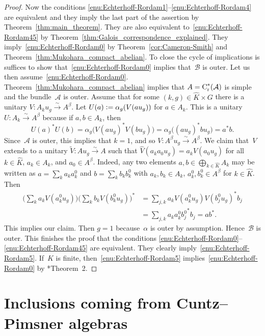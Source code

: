 \documentclass[a4paper]{amsart}
\theoremstyle{plain}
\theoremstyle{definition}
\theoremstyle{remark}
\numberwithin{theorem}{section}
\numberwithin{equation}{section}
\newcommand*{\red}{\mathrm{r}}%
\newcommand*{\Cst}{\textup C^*}%
\newcommand*{\B}{\mathcal B}%
\newcommand*{\A}{\mathcal A}%
\newcommand*{\defeq}{\mathrel{\vcentcolon=}}%
\newcommand*{\congto}{\xrightarrow\sim}
\begin{document}
\begin{proof}
  Now the
  conditions \ref{enu:Echterhoff-Rordam1}--\ref{enu:Echterhoff-Rordam4}
  are equivalent and they imply the last part of the assertion by
  Theorem~\ref{thm:main_theorem}.
  They are also equivalent to~\ref{enu:Echterhoff-Rordam45} by
  Theorem~\ref{thm:Galois_correspondence_explained}.
  They imply~\ref{enu:Echterhoff-Rordam0} by
  Theorem~\ref{cor:Cameron-Smith} and
  Theorem~\ref{thm:Mukohara_compact_abelian}.
  To close the cycle of implications is suffices to show
  that~\ref{enu:Echterhoff-Rordam0} implies that~\(\B\) is outer.
  Let us then assume~\ref{enu:Echterhoff-Rordam0}.
  Theorem~\ref{thm:Mukohara_compact_abelian} implies that
  \(A=\Cst_\red(\A)\) is simple and the bundle~\(\A\) is outer.
  Assume that for some \((k,g)\in \widehat{K}\times G\) there
  is a unitary \(V\colon A_k u_g\congto A^\beta\).
  Let \(U(a)\defeq \alpha_g(V(au_g))\) for \(a\in A_k\).
  This is a unitary \(U\colon A_k\congto A^\beta\) because if \(a,b\in
  A_k\), then
  \[
    U(a)^*U(b)
    = \alpha_g\bigl(V(au_g)^*V(bu_g)\bigr)
    = \alpha_g\bigl((au_g)^*bu_g\bigr)
    = a^*b.
  \]
  Since~\(\A\) is outer, this implies that \(k=1\), and so \(V\colon
  A^\beta u_g\congto A^\beta\).
  We claim that~\(V\) extends to a unitary \(\widetilde{V}\colon A
  u_g\congto A\) such that \(\widehat{V}(a_k a_0 u_g)=a_k V(a_0 u_g)\)
  for all \(k\in \widehat{K}\), \(a_k\in A_k\), and \(a_0\in A^\beta\).
  Indeed, any two elements \(a, b\in \bigoplus_{k\in \widehat{K}} A_k\)
  may be written as \(a=\sum_k a_k a_k^0\) and \(b=\sum_k b_k b_k^0\)
  with \(a_k, b_k\in A_k\), \(a_k^0,  b_k^0\in A^\beta\) for \(k\in \widehat{K}\).
  Then
  \begin{align*}
    \biggl( \sum_k a_k V(a_k^0 u_g) \biggr)
    \biggl( \sum_k b_k V(b_k^0 u_g) \biggr)^*
    &= \sum_{j,k} a_k  V(a_k^0 u_g)V(b_j^0 u_g)^* b_j
    \\
		&= \sum_{j,k} a_k  a_k^0 {b_j^0}^*  b_j
    = a b^*.
  \end{align*}
  This implies our claim.
  Then \(g=1\) because~\(\alpha\) is outer by assumption.
  Hence~\(\B\) is outer.
  This finishes the proof that the conditions
  \ref{enu:Echterhoff-Rordam0}--\ref{enu:Echterhoff-Rordam45} are
  equivalent.
  They clearly imply~\ref{enu:Echterhoff-Rordam5}.
  If~\(K\) is finite, then~\ref{enu:Echterhoff-Rordam5}
  implies~\ref{enu:Echterhoff-Rordam0} by
  \cite{Olesen-Pedersen-Stormer:Compact_abelian_auto_simple}*{Theorem~2}.
\end{proof}


\section{Inclusions coming from Cuntz--Pimsner algebras}
\label{sect:Cuntz-Pimnser}
\end{document}
